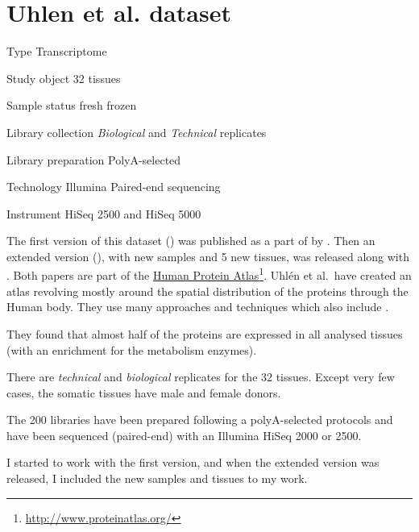 \chapter{Uhlen et al. dataset}
\label{ch:uhlenData}

\begin{eqlist}
    \item[Type] Transcriptome
    \item[Study object] 32 tissues
    \item[Sample status] fresh frozen
    \item[Library collection] \emph{Biological} and \emph{Technical} replicates
    \item[Library preparation] PolyA-selected
    \item[Technology] Illumina Paired-end sequencing
    \item[Instrument] HiSeq 2500 and HiSeq 5000
\end{eqlist}


The first version of this dataset () was published
as a part of  by \citet{Uhlen2014}. Then an extended
version (), with new samples and 5 new tissues,
was released along with  \citep{Uhlen2015}.
Both papers are part of the
\href{http://www.proteinatlas.org/}{Human Protein Atlas}\footnote{%
\href{http://www.proteinatlas.org/}{http://www.proteinatlas.org/}}.
Uhlén et al.\ have created
an atlas revolving mostly around the spatial distribution of the proteins through
the Human body. They use many approaches and techniques which also include \Rnaseq.

They found that almost half of the proteins are expressed in all analysed tissues
(with an enrichment for the metabolism enzymes).

There are \emph{technical} and \emph{biological} replicates for the 32 tissues.
Except very few cases, the somatic tissues have male and female donors.

The 200 libraries have been prepared following a polyA-selected protocols and
have been sequenced (paired-end) with an Illumina HiSeq 2000 or 2500.

I started to work with the first version, and when the extended version was
released, I included the new samples and tissues to my work.
